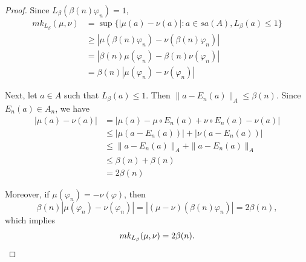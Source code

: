 \documentclass[10pt,a4paper]{amsart}
\renewcommand{\geq}{\geqslant}
\renewcommand{\leq}{\leqslant}
\newcommand{\vhi}{{\varphi}}
\begin{document}
\begin{proof}
Since $L_\beta(\beta(n)\vhi_n)=1$, 
    \begin{align*}
        mk_{L_\beta}(\mu, \nu) &= \sup \{|\mu(a)-\nu(a)| : a\in sa(A), L_\beta(a)\leq 1\}\\
       & \geq |\mu(\beta(n)\vhi_n) - \nu(\beta(n)\vhi_n)|\\
        &=|\beta(n)\mu(\vhi_n) - \beta(n)\nu(\vhi_n)| \\
       & = \beta(n)|\mu(\vhi_n)-\nu(\vhi_n)|
    \end{align*}

    Next, let $a \in A$ such that $L_\beta(a) \leq 1$. Then $\|a-E_n(a)\|_A \leq \beta(n)$. Since $E_n(a) \in A_n$, we have
    \begin{align*}
        |\mu(a)-\nu(a)| &= | \mu(a)- \mu \circ E_n(a) + \nu \circ E_n(a) - \nu(a) |\\
        &\leq |\mu(a-E_n(a))| +|\nu(a-E_n(a))| \\
        &\leq \|a-E_n(a)\|_A + \|a-E_n(a)\|_A\\
        &\leq \beta(n) + \beta(n)\\
        &= 2\beta(n)
    \end{align*} 

    Moreover, if $ \mu(\vhi_n)=-\nu(\vhi)$, then 
    \[
 \beta(n)|\mu(\vhi_n)-\nu(\vhi_n)|=|(\mu-\nu)(\beta(n)\vhi_n)|=2\beta(n),
\]
which implies
\[
mk_{L_\beta}(\mu, \nu) = 2 \beta(n) . \qedhere
\]
\end{proof}
\end{document}
